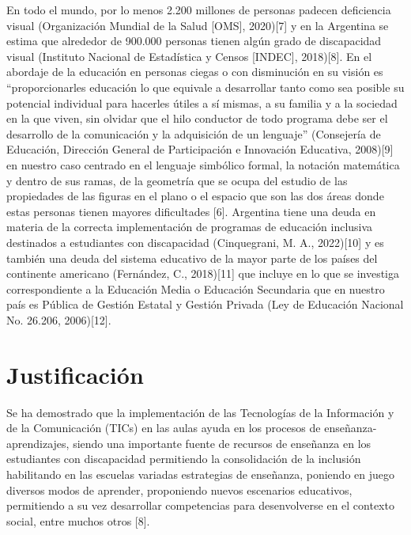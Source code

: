 \documentclass{article}
\begin{document}
{\changefontsizes{8.8pt}
En todo el mundo, por lo menos 2.200 millones de personas padecen deficiencia visual (Organización Mundial de la Salud [OMS], 2020)[7] y en la Argentina se estima que alrededor de 900.000 personas tienen algún grado de discapacidad visual (Instituto Nacional de Estadística y Censos [INDEC], 2018)[8].
En el abordaje de la educación en personas ciegas o con disminución en su visión es “proporcionarles educación lo que equivale a desarrollar tanto como sea posible su potencial individual para hacerles útiles a sí mismas, a su familia y a la sociedad en la que viven, sin olvidar que el hilo conductor de todo programa debe ser el desarrollo de la comunicación y la adquisición de un lenguaje” (Consejería de Educación, Dirección General de Participación e Innovación Educativa, 2008)[9] en nuestro caso centrado en el lenguaje simbólico formal, la notación matemática y dentro de sus ramas, de la geometría que se ocupa del estudio de las propiedades de las figuras en el plano o el espacio que son las dos áreas donde estas personas tienen mayores dificultades [6]. Argentina tiene una deuda en materia de la correcta implementación de programas de educación inclusiva destinados a estudiantes con discapacidad (Cinquegrani, M. A., 2022)[10] y es también una deuda del sistema educativo de la mayor parte de los países del continente americano (Fernández, C., 2018)[11]  que incluye en lo que se investiga correspondiente a la Educación Media o Educación Secundaria que en nuestro país es Pública de Gestión Estatal y Gestión Privada (Ley de Educación Nacional No. 26.206, 2006)[12].
}

\section{\fontsize{10pt}{14pt} Justificación}

{\changefontsizes{8.8pt}
Se ha demostrado que la implementación de las Tecnologías de la Información y de la Comunicación (TICs) en las aulas ayuda en los procesos de enseñanza-aprendizajes, siendo una importante fuente de recursos de enseñanza en los estudiantes con discapacidad permitiendo la consolidación de la inclusión habilitando en las escuelas variadas estrategias de enseñanza, poniendo en juego diversos modos de aprender, proponiendo nuevos escenarios educativos, permitiendo a su vez desarrollar competencias para desenvolverse en el contexto social, entre muchos otros [8].
}
\end{document}
